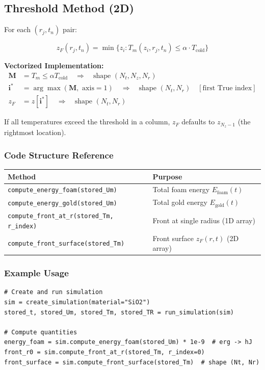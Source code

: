 \documentclass[11pt]{article}
\begin{document}
\subsection{Threshold Method (2D)}

For each $(r_j, t_n)$ pair:

\begin{equation}
z_F(r_j,t_n) = \min\{z_i : T_m(z_i,r_j,t_n) \le \alpha \cdot T_{\text{cold}}\}
\end{equation}

\noindent \textbf{Vectorized Implementation:}
\begin{align}
\mathbf{M} &= T_m \le \alpha T_{\text{cold}} \quad \Rightarrow \quad \text{shape } (N_t, N_z, N_r) \\
\mathbf{i}^* &= \arg\max(\mathbf{M}, \text{ axis}=1) \quad \Rightarrow \quad \text{shape } (N_t, N_r) \quad [\text{first True index}] \\
z_F &= z[\mathbf{i}^*] \quad \Rightarrow \quad \text{shape } (N_t, N_r)
\end{align}

\noindent If all temperatures exceed the threshold in a column, $z_F$ defaults to $z_{N_z-1}$ (the rightmost location).

\subsubsection*{Code Structure Reference}

\begin{table}[h]
\centering
\begin{tabular}{|l|l|}
\hline
\textbf{Method} & \textbf{Purpose} \\
\hline
\texttt{compute\_energy\_foam(stored\_Um)} & Total foam energy $E_{\text{foam}}(t)$ \\
\texttt{compute\_energy\_gold(stored\_Um)} & Total gold energy $E_{\text{gold}}(t)$ \\
\texttt{compute\_front\_at\_r(stored\_Tm, r\_index)} & Front at single radius (1D array) \\
\texttt{compute\_front\_surface(stored\_Tm)} & Front surface $z_F(r,t)$ (2D array) \\
\hline
\end{tabular}
\end{table}


\subsubsection*{Example Usage}

\begin{verbatim}
# Create and run simulation
sim = create_simulation(material="SiO2")
stored_t, stored_Um, stored_Tm, stored_TR = run_simulation(sim)

# Compute quantities
energy_foam = sim.compute_energy_foam(stored_Um) * 1e-9  # erg -> hJ
front_r0 = sim.compute_front_at_r(stored_Tm, r_index=0)
front_surface = sim.compute_front_surface(stored_Tm)  # shape (Nt, Nr)
\end{verbatim}
\end{document}
